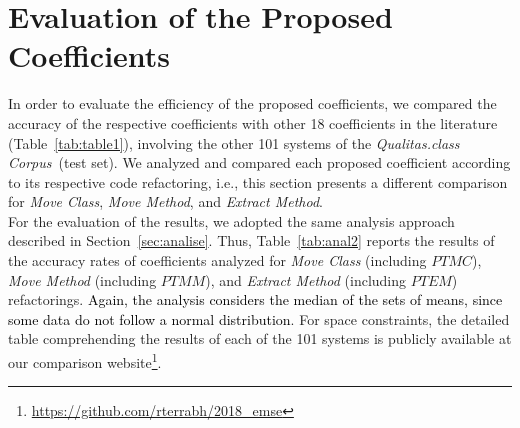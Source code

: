 \documentclass[smallextended,natbib]{svjour3}
\begin{document}
{\section{Evaluation of the Proposed Coefficients}
\label{sec:avaliacao}

In order to evaluate the efficiency of the proposed coefficients, we compared the accuracy of the respective coefficients with other 18 coefficients in the literature (Table~\ref{tab:table1}), involving the other 101 systems of the \textit{Qualitas.class Corpus}~(test set). We analyzed and compared each proposed coefficient according to its respective code refactoring, i.e., this section presents a different comparison for  \textit{Move Class}, \textit{Move Method}, and \textit{Extract Method}.\\[-0.2cm]

For the evaluation of the results, we adopted the same analysis approach described in Section~\ref{sec:analise}. Thus, Table~\ref{tab:anal2} reports the results of the accuracy rates of coefficients analyzed for \textit{Move Class} (including $PTMC$), \textit{Move Method} (including $PTMM$), and \textit{Extract Method} (including $PTEM$) refactorings. \textcolor{black}{Again, the analysis considers the median of the sets of means, since some data do not follow a normal distribution}. For space constraints, the detailed table comprehending the results of each of the 101 systems is publicly available at our comparison website\footnote{\url{https://github.com/rterrabh/2018_emse}}.\\[-0.2cm]


}
\end{document}
